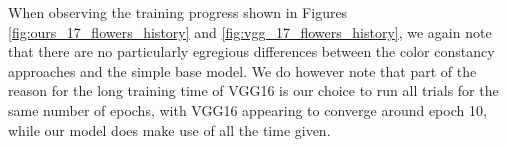 \def\historygraphheight{5cm}

When observing the training progress shown in Figures \ref{fig:ours_17_flowers_history} and \ref{fig:vgg_17_flowers_history}, we again note that there are no particularly
egregious differences between the color constancy approaches and the simple base model. We do however note that part of the reason for the long training time of VGG16
is our choice to run all trials for the same number of epochs, with VGG16 appearing to converge around epoch 10, while our model does make use of all the time given.

\ourssmalltrainloss
{}\ourssmalltrainacc
{}\ourssmallvalloss
{}\ourssmallvalacc


